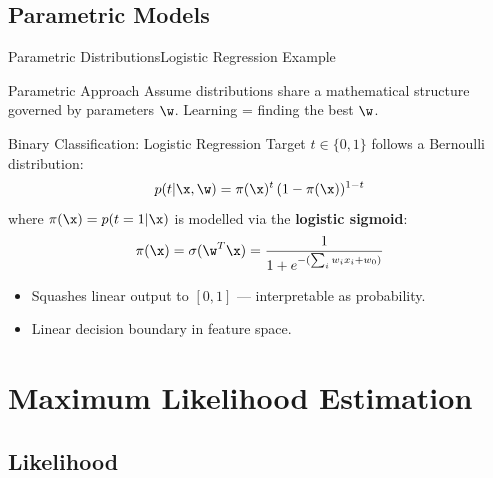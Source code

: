 \subsection{Parametric Models}

\begin{frame}{Parametric Distributions}{Logistic Regression Example}
  \begin{block}{Parametric Approach}
    Assume distributions share a mathematical structure governed by parameters $\w$. Learning = finding the best $\w$.
  \end{block}

  \begin{exampleblock}{Binary Classification: Logistic Regression}
    Target $t \in \{0,1\}$ follows a Bernoulli distribution:
    \[
      p(t|\x,\w) = \pi(\x)^t\,(1-\pi(\x))^{1-t}
    \]
    where $\pi(\x) = p(t=1|\x)$ is modelled via the \textbf{logistic sigmoid}:
    \[
      \pi(\x) = \sigma(\w^T\x) = \frac{1}{1 + e^{-(\sum_i w_i x_i + w_0)}}
    \]
    \begin{itemize}
      \item Squashes linear output to $[0,1]$ — interpretable as probability.
      \item Linear decision boundary in feature space.
    \end{itemize}
  \end{exampleblock}
\end{frame}

\section{Maximum Likelihood Estimation}

\subsection{Likelihood}


